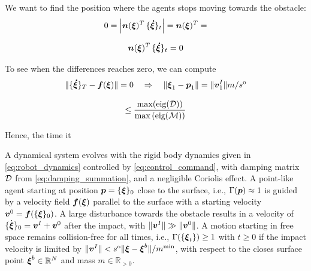 We want to find the position where the agents stops moving towards the obstacle:
\begin{equation}
0 = \left| \boldsymbol{n}(\boldsymbol{\xi})^T \, \{ \boldsymbol{\dot \xi} \}_{t} \right| 
= \boldsymbol{n}(\boldsymbol{\xi})^T 
=    
\end{equation}


\begin{equation}
\begin{split}
\boldsymbol{n}(\boldsymbol{\xi})^T \, \{ \boldsymbol{\dot \xi} \}_{t} = 0
\end{split}
\end{equation}

To see when the differences reaches zero, we can compute
\begin{equation}
 \|	\{ \boldsymbol{\dot \xi} \}_T - \boldsymbol{f}(\boldsymbol{\xi}) \| = 0
 \quad \Rightarrow \quad
    \| \boldsymbol{\xi}_1 -  \boldsymbol{p}_1 \| = \| \boldsymbol{v}^I_1 \| {m} / {s^{\mathrm{o}}} 
 \end{equation}

\begin{equation}
	\leq \frac{\max({\text{eig}(\mathcal{D})})}{\max{(\text{eig}(\mathcal{M})}) }
\end{equation}

Hence, the time it  



\begin{lemma}
	A dynamical system evolves with the rigid body dynamics given in \eqref{eq:robot_dynamics} controlled by \eqref{eq:control_command}, with damping matrix $\mathcal{D}$ from \eqref{eq:damping_summation}, and a negligible Coriolis effect.
    A point-like agent starting at position $\boldsymbol{p} = \{{\boldsymbol{\xi}}\}_0$ close to the surface, i.e., $\Gamma( \boldsymbol{p}) \approx 1$ is guided by a velocity field $\boldsymbol{f}(\boldsymbol{\xi})$ parallel to the surface with a starting velocity $\boldsymbol{v}^0= \boldsymbol{f}(\{{\boldsymbol{\xi}}\}_0)$.
    A large disturbance towards the obstacle results in a velocity of $\{\dot{\boldsymbol{\xi}}\}_0 = \boldsymbol{v}^I +  \boldsymbol{v}^0$ after the impact, with $\| \boldsymbol{v}^I \| \gg \| \boldsymbol{v}^0 \|$.
	A motion starting in free space remains collision-free for all times, i.e., $\Gamma( \{\boldsymbol{\xi}_t\}) \geq 1$ with $t \geq 0$ if the impact velocity is limited by $\| \boldsymbol{v}^I\| < s^{\mathrm{o}} \| \boldsymbol{\xi} - \boldsymbol{\xi}^b \| / m^{\mathrm{min}}$, with respect to the closes surface point $\boldsymbol{\xi}^b \in \mathbb{R}^N$ and mass $m \in \mathbb{R}_{>0}$.
\end{lemma}


